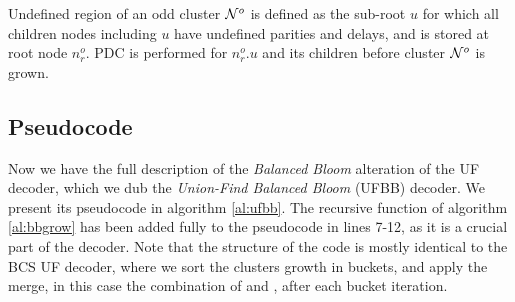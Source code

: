 \begin{theorem}\label{the:delayonce}
  Undefined region of an odd cluster $\mathcal{N}^o$ is defined as the sub-root $u$ for which all children nodes including $u$ have undefined parities and delays, and is stored at root node $n^o_r$. PDC is performed for $n^o_r.u$ and its children before cluster $\mathcal{N}^o$ is grown.
\end{theorem}

\subsection{Pseudocode}
Now we have the full description of the \emph{Balanced Bloom} alteration of the UF decoder, which we dub the \emph{Union-Find Balanced Bloom} (UFBB) decoder. We present its pseudocode in algorithm \ref{al:ufbb}. The recursive  function of algorithm \ref{al:bbgrow} has been added fully to the pseudocode in lines 7-12, as it is a crucial part of the decoder. Note that the structure of the code is mostly identical to the BCS UF decoder, where we sort the clusters growth in buckets, and apply the merge, in this case the combination of  and , after each bucket iteration.

\begin{algo}[algotitle=Union-Find Balanced Bloom (UFBB), label=al:ufbb]
\begin{algorithm}[H]

\KwData{\buckets}

\BlankLine

\end{algorithm}
\end{algo}


